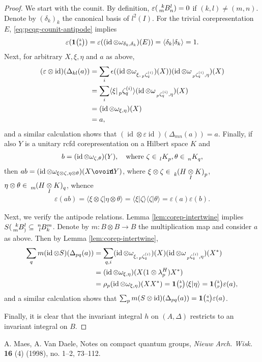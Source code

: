 \documentclass[11pt]{article}
\DeclareMathOperator{\id}{id}
\newcommand{\Circt}{{\mathop{\ooalign{$\ovoid$\cr\hidewidth\raise-.05ex\hbox{$\scriptstyle\mathsf T\mkern3.5mu$}\cr}}}} %
\newcommand{\itimes}{\underset{I}{\otimes}}
\newcommand{\Grt}[3]{#1{\tiny {\begin{pmatrix} #2\\#3\end{pmatrix}}}}
\newcommand{\UnitC}[2]{\Grt{\mathbf{1}}{#1}{#2}}
\newcommand{\Gr}[5]{\,\tensor*[^{#2}_{#4}]{#1}{^{#3}_{#5}}}%
\newcommand{\Grd}[3]{\Gr{#1}{}{}{#2}{#3}}
\theoremstyle{definition}
\numberwithin{equation}{section}
\begin{document}
\begin{proof}
  We start with the counit.  By definition, $\varepsilon(\Gr{B}{k}{l}{m}{n})=0$ if $(k,l)\neq
  (m,n)$.  Denote by $(\delta_{k})_{k}$ the canonical basis of $l^{2}(I)$. For the trivial
  corepresentation $E$, \eqref{eq:pcqg-counit-antipode} implies
  \begin{align*}
    \varepsilon(\UnitC{k}{k}) = \varepsilon((\id \otimes \omega_{\delta_{k},\delta_{k}})(E)) =
    \langle \delta_{k}|\delta_{k}\rangle = 1.
  \end{align*}
Next,   for arbitrary $X,\xi,\eta$ and $a$ as above,
\begin{align*}
    (\varepsilon \otimes\id)(\Delta_{kl}(a)) &= \sum_{i}\epsilon((\id \otimes
    \omega_{\xi,\Gr{\zeta}{}{(i)}{p}{q}})(X)) (\id \otimes \omega_{\Gr{\zeta}{}{(i)}{p}{q},\eta})(X)
    \\
    &= \sum_{i}\langle \xi|\Gr{\zeta}{}{(i)}{p}{q}\rangle(\id \otimes
    \omega_{\Gr{\zeta}{}{(i)}{p}{q},\eta})(X) \\ &= (\id \otimes \omega_{\xi,\eta})(X) \\ &= a,
  \end{align*}
  and a similar calculation shows that  $    (\id \otimes \varepsilon\id)(\Delta_{mn}(a))=a$.
Finally, if also $Y$ is a unitary rcfd corepresentation on a Hilbert space $K$ and
\begin{align*}
  b=(\id \otimes \omega_{\zeta,\theta})(Y), \quad \text{where } \zeta \in \Grd{K}{l}{p}, \theta \in \Grd{K}{n}{q},
\end{align*}
then $ab = (\id \otimes \omega_{\xi\otimes \zeta,\eta\otimes \theta})(X\Circt Y)$, where $\xi\otimes \zeta \in \Grd{(H\itimes K)}{k}{p}$, $\eta\otimes \theta \in \Grd{(H\itimes
  K)}{m}{q}$, whence
\begin{align*}
  \varepsilon(ab) = \langle \xi\otimes \zeta|\eta\otimes \theta\rangle = \langle
  \xi|\zeta\rangle\langle \zeta|\theta\rangle = \varepsilon(a)\varepsilon(b).
\end{align*}

Next, we verify the antipode relations. 
Lemma \ref{lem:corep-intertwine} implies $S(\Gr{B}{k}{l}{m}) \subseteq \Gr{B}{n}{m}{l}{k}$.
Denote by $m \colon B\otimes B\to B$ the multiplication
map and consider $a$ as above. Then by Lemma \ref{lem:corep-intertwine},
\begin{align*}
  \sum_{q} m(\id \otimes S)(\Delta_{pq}(a)) &= 
  \sum_{q,i} (\id \otimes \omega_{\xi,\Gr{\zeta}{}{(i)}{p}{q}})(X)  (\id \otimes
  \omega_{\Gr{\zeta}{}{(i)}{p}{q},\eta})(X^{*}) \\ &=
 (\id \otimes \omega_{\xi,\eta})(X(1\otimes \lambda^{H}_{p})X^{*})  \\
  &= \rho_{p}  (\id \otimes \omega_{\xi,\eta})(XX^{*})  = \UnitC{k}{p}\langle \xi|\eta\rangle =\UnitC{k}{p} \varepsilon(a),
\end{align*}
and a similar calculation shows that $\sum_{p} m(S \otimes \id)(\Delta_{pq}(a)) = \UnitC{q}{n}\varepsilon(a)$.

Finally, it is clear that the invariant integral $h$ on $(A,\Delta)$ restricts to an invariant
integral on $B$.
\end{proof}




\begin{thebibliography}{00}

 A. Maes, A. Van Daele, Notes on compact quantum groups, \emph{Nieuw Arch. Wisk.} \textbf{16} (4) (1998), no. 1--2, 73--112. 

\end{thebibliography}
\end{document}
